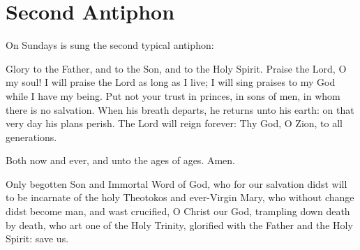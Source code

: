 \section{Second Antiphon}

\begin{rubricmed}
    On Sundays is sung the second typical antiphon:
\end{rubricmed}

\begin{liturgicaltext}
    \choir Glory to the Father, and to the Son, and to the Holy Spirit. Praise the Lord, O my soul! I will praise the Lord as long as I live; I will sing praises to my God while I have my being. Put not your trust in princes, in sons of men, in whom there is no salvation. When his breath departs, he returns unto his earth: on that very day his plans perish. The Lord will reign forever: Thy God, O Zion, to all generations.
    \item[] Both now and ever, and unto the ages of ages. Amen.
    \item[] Only begotten Son and Immortal Word of God, who for our salvation didst will to be incarnate of the holy Theotokos and ever-Virgin Mary, who without change didst become man, and wast crucified, O Christ our God, trampling down death by death, who art one of the Holy Trinity, glorified with the Father and the Holy Spirit: save us.
\end{liturgicaltext}